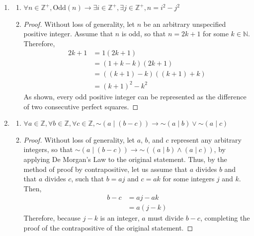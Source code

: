 \documentclass[11pt, notitlepage, leqno]{article}
\renewcommand{\neg}{\mathord{\sim}}
\begin{document}

\begin{enumerate}

\item \begin{enumerate}

\item $\forall n \in \mathbb{Z}^{+}, \textrm{Odd}(n) \to \exists i \in \mathbb{Z}^{+}, \exists j \in \mathbb{Z}^{+}, n = i^2 - j^2$

\item \begin{proof}
Without loss of generality, let $n$ be an arbitrary unspecified positive integer. Assume that $n$ is odd, so that $n = 2k + 1$ for some $k \in \mathbb{N}$. Therefore,
\begin{align*}
	2k+1 &= 1(2k+1) \\
	&= (1 + k - k) (2k + 1) \\
	&= ((k+1) - k) ((k + 1) + k)\\
	&= (k+1)^2 - k^2
\end{align*}
As shown, every odd positive integer can be represented as the difference of two consecutive perfect squares.
\end{proof}
\end{enumerate}

\item \begin{enumerate}

\item $\forall a \in \mathbb{Z}, \forall b \in \mathbb{Z}, \forall c \in \mathbb{Z}, \neg(a \mid (b-c)) \to \neg(a \mid b) \vee  \neg(a \mid c)$

\item \begin{proof}
Without loss of generality, let $a$, $b$, and $c$ represent any arbitrary integers, so that $\neg(a \mid (b-c)) \to \neg((a \mid b) \wedge (a \mid c))$, by applying De Morgan's Law to the original statement. Thus, by the method of proof by contrapositive, let us assume that $a$ divides $b$ and that $a$ divides $c$, such that $b=aj$ and $c=ak$ for some integers $j$ and $k$. Then,
\begin{align*}
b - c  &= aj - ak\\
&= a(j-k)
\end{align*}
Therefore, because $j-k$ is an integer, $a$ must divide $b-c$, completing the proof of the contrapositive of the original statement.
\end{proof}


\end{enumerate}
\end{enumerate}
\end{document}
